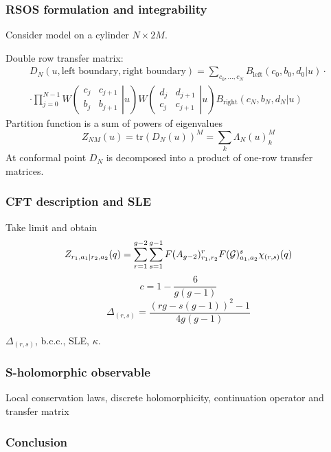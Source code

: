 \documentclass[pdftex]{beamer}
\theoremstyle{definition} \newtheorem{Def}{Definition}
\begin{document}
   \begin{frame}
     \frametitle{RSOS formulation and integrability}
     Consider model on a cylinder $N\times 2M$. 

     Double row transfer matrix:
     \begin{multline}
       \label{eq:5}

       D_N(u,\mbox{left boundary},\mbox{right boundary})=\sum_{c_0,\dots,c_N} B_{\mathrm{left}}(c_0,b_0,d_0| u)\cdot\\
       \cdot\prod_{j=0}^{N-1} W \left(\left.\begin{array}{cc} c_j & c_{j+1} \\ b_j & b_{j+1} \end{array}\right| u\right) 
       W \left(\left.\begin{array}{cc} d_j & d_{j+1} \\ c_j & c_{j+1} \end{array}\right| u\right) B_{\mathrm{right}} (c_N, b_N, d_N|u)
     \end{multline}
     Partition function is a sum of powers of eigenvalues
     \begin{equation}
       \label{eq:9}
       Z_{NM}(u)=\mathrm{tr} (D_N(u))^M=\sum_k \Lambda_N(u)_k ^M
     \end{equation}
     At conformal point $D_N$ is decomposed into a product of one-row transfer matrices. 

   \end{frame}
  \begin{frame}
    \frametitle{ CFT description and SLE }
    Take limit and obtain
     \begin{equation}
       \label{eq:10}
       Z_{r_1,a_1|r_2,a_2}(q) = \sum_{r=1}^{g-2} \sum_{s=1}^{g-1} F(A_{g-2})_{r_1,r_2}^r F({\cal G})_{a_1,a_2}^s \chi_{(r,s)}(q)
     \end{equation}
     \begin{equation}
       \label{eq:11}
       c=1-\frac{6}{g(g-1)}
     \end{equation}
     \begin{equation}
       \label{eq:13}
       \Delta_{(r,s)}=\frac{(rg-s(g-1))^2-1}{4g(g-1)}
     \end{equation}

     $\Delta_{(r,s)}$, b.c.c., SLE, $\kappa$. 
  \end{frame}
  \begin{frame}
    \frametitle{ S-holomorphic observable}
    Local conservation laws, discrete holomorphicity, continuation operator and transfer matrix
  \end{frame}
  \begin{frame}
    \frametitle{ Conclusion}
  \end{frame}
{} 
  
\end{document}
